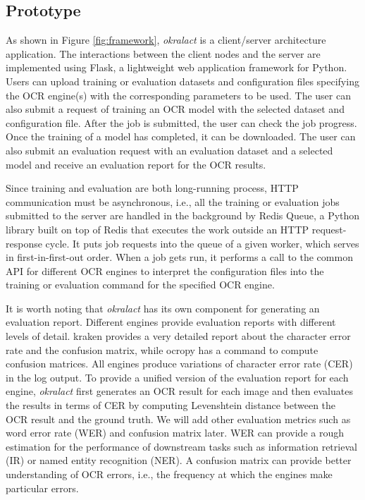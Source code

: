 \documentclass[sigconf]{acmart}
\begin{document}
\subsection{Prototype}
\label{sec:prototype}

As shown in Figure \ref{fig:framework}, \textit{okralact} is a client/server
architecture application. The interactions between the client nodes and the
server are implemented using Flask, a lightweight web application framework for Python.
Users can upload training or evaluation datasets and configuration files
specifying the OCR engine(s) with the corresponding parameters to be used. 
The user can also submit a request of training an OCR model with the selected 
dataset and configuration file. After the job is submitted, the user can check the job
progress. Once the training of a model has completed, it can be downloaded.
The user can also submit an evaluation request with an evaluation dataset and
a selected model and receive an evaluation report for the OCR results. 



Since training and evaluation are both long-running process, HTTP communication must be asynchronous,
i.e., all the training or evaluation
jobs submitted to the server are handled in the background by Redis Queue,
a Python library built on top of Redis that
executes the work outside an HTTP request-response cycle. It puts job
requests into the queue of a given worker, which serves in
first-in-first-out order. When a job gets run, it performs a call to the common
API for different OCR engines to interpret the configuration files into the
training or evaluation command for the specified OCR engine. 

It is worth noting that \textit{okralact} has its own component for generating an evaluation report. Different engines provide evaluation reports with different levels of detail. kraken provides a very detailed report about the character error rate and the confusion matrix, while ocropy has a command to compute confusion matrices. All engines produce variations of character error rate (CER) in the log output. To provide a unified version of the evaluation report for each engine, \textit{okralact} first generates an OCR result for each image and then evaluates the results in terms of CER by computing Levenshtein distance between the OCR result and the ground truth. We will add other evaluation metrics such as word error rate (WER) and confusion matrix later. WER can provide a rough estimation for the performance of downstream tasks such as information retrieval (IR) or named entity recognition (NER). A confusion matrix can provide better understanding of OCR errors, i.e., the frequency at which the engines make particular errors.
\end{document}

